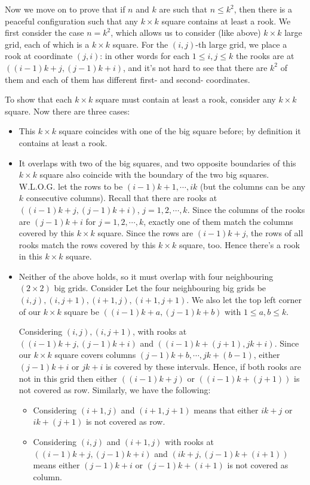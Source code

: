\documentclass[11pt,a4paper]{article}
\begin{document}
\begin{enumerate}
	Now we move on to prove that if $n$ and $k$ are such that $n\le k^2$, then there is a peaceful configuration such that any $k\times k$ square contains at least a rook. We first consider the case $n=k^2$, which allows us to consider (like above) $k\times k$ large grid, each of which is a $k\times k$ square. For the $(i, j)$-th large grid, we place a rook at coordinate $(j, i)$: in other words for each $1\le i, j\le k$ the rooks are at $((i-1)k+j, (j-1)k+i)$, and it's not hard to see that there are $k^2$ of them and each of them has different first- and second- coordinates. 
	
	To show that each $k\times k$ square must contain at least a rook, consider any $k\times k$ square. Now there are three cases: 
	\begin{itemize}
		\item This $k\times k$ square coincides with one of the big square before; by definition it contains at least a rook. 
		
		\item It overlaps with two of the big squares, and two opposite boundaries of this $k\times k$ square also coincide with the boundary of the two big squares. W.L.O.G. let the rows to be $(i-1)k+1, \cdots , ik$ (but the columns can be any $k$ consecutive columns). Recall that there are rooks at $((i-1)k+j, (j-1)k+i)$, $j=1, 2, \cdots , k$. Since the columns of the rooks are $(j-1)k+i$ for $j=1, 2, \cdots , k$, exactly one of them match the columns covered by this $k\times k$ square. Since the rows are $(i-1)k+j$, the rows of all rooks match the rows covered by this $k\times k$ square, too. Hence there's a rook in this $k\times k$ square. 
		
		\item Neither of the above holds, so it must overlap with four neighbouring $(2\times 2)$ big grids. Consider Let the four neighbouring big grids be $(i, j), (i, j+1), (i+1, j), (i+1, j+1)$. We also let the top left corner of our $k\times k$ square be $((i-1)k+a, (j-1)k+b)$ with $1\le a, b\le k$. 
		
		Considering $(i, j), (i, j+1)$, with rooks at $((i-1)k+j, (j-1)k+i)$ and $((i-1)k+(j+1), jk+i)$. Since our $k\times k$ square covers columns $(j-1)k+b, \cdots , jk+(b-1)$, either $(j-1)k+i$ or $jk+i$ is covered by these intervals. Hence, if both rooks are not in this grid then either $((i-1)k+j)$ or $((i-1)k+(j+1))$ is not covered as row. 
		Similarly, we have the following: 
		\begin{itemize}
			\item Considering $(i+1, j)$ and $(i+1, j+1)$ means that either $ik+j$ or $ik+(j+1)$ is not covered as row. 
			\item Considering $(i, j)$ and $(i+1, j)$ with rooks at $((i-1)k+j, (j-1)k+i)$ and $(ik+j, (j-1)k+(i+1))$ means either $(j-1)k+i$ or $(j-1)k+(i+1)$ is not covered as column. 
			

\end{itemize}
\end{itemize}
\end{enumerate}
\end{document}
